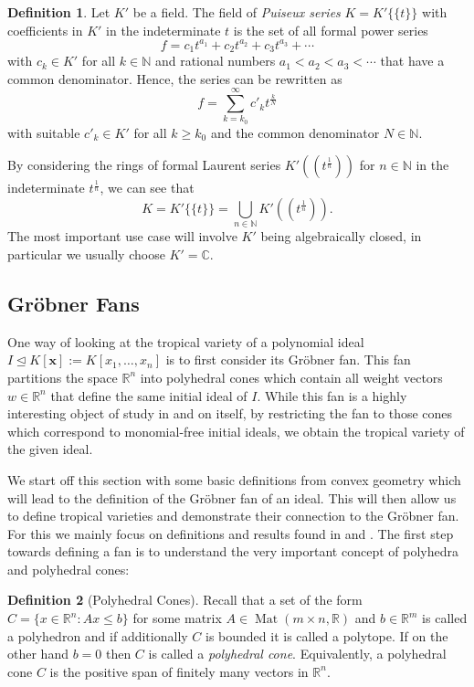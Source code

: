 \documentclass[
  paper=a4,
  titlepage,
  bibliography=totoc,
  listof=totoc,
  pagesize=pdftex
]{scrartcl}
\numberwithin{figure}{section}
\numberwithin{equation}{section}
\numberwithin{table}{section}
\newcommand*\setR{\mathds{R}}
\newcommand*\setC{\mathds{C}}
\newcommand*\setN{\mathds{N}}
\newcommand*\puiseux[2]{#1\{\!\{#2\}\!\}}
\let\vec\mathbf
\let\idealof\trianglelefteq
\DeclareMathOperator{\Mat}{Mat}
\theoremstyle{definition}
\newtheorem{definition}{Definition}
\numberwithin{definition}{section}
\begin{document}
\begin{definition}
  Let $K'$ be a field. The field of \emph{Puiseux series} $K = \puiseux{K'}{t}$ with
  coefficients in $K'$ in the indeterminate $t$ is the set of all formal power series
  \[
    f = c_1 t^{a_1} + c_2 t^{a_2} + c_3 t^{a_3} + \cdots
  \]
  with $c_k \in K'$ for all $k \in \setN$ and rational numbers $a_1 < a_2 < a_3 < \cdots$
  that have a common denominator. Hence, the series can be rewritten as
  \[
    f = \sum_{k = k_0}^\infty c'_k t^{\frac kN}
  \]
  with suitable $c'_k \in K'$ for all $k\geq k_0$ and the common denominator $N \in
  \setN$.
  \label{def:puiseux}
\end{definition}

By considering the rings of formal Laurent series $K'((t^{\frac1n}))$ for $n \in \setN$ in
the indeterminate $t^{\frac1n}$, we can see that
\[
  K = \puiseux{K'}t = \bigcup_{n \in \setN} K'((t^{\frac1n})).
\]
The most important use case will involve $K'$ being algebraically closed, in particular we
usually choose $K'=\setC$.

\subsection{Gröbner Fans}
\label{sec:grobFan}

One way of looking at the tropical variety of a polynomial ideal $I \idealof K[\vec x] :=
K[x_1, \dots, x_n]$ is to first consider its Gröbner fan. This fan partitions the space
$\setR^n$ into polyhedral cones which contain all weight vectors $w\in \setR^n$ that
define the same initial ideal of $I$. While this fan is a highly interesting object of
study in and on itself, by restricting the fan to those cones which correspond to
monomial-free initial ideals, we obtain the tropical variety of the given ideal.

We start off this section with some basic definitions from convex geometry which will lead
to the definition of the Gröbner fan of an ideal. This will then allow us to define
tropical varieties and demonstrate their connection to the Gröbner fan. For this we mainly
focus on definitions and results found in \cite{compGrobFan} and \cite{SturmGBCP}. The
first step towards defining a fan is to understand the very important concept of polyhedra
and polyhedral cones:

\begin{definition}[Polyhedral Cones]
  Recall that a set of the form $C = \{ x \in \setR^n : Ax \leq b \}$ for some matrix $A
  \in \Mat(m\times n, \setR)$ and $b \in \setR^m$ is called a polyhedron and if
  additionally $C$ is bounded it is called a polytope. If on the other hand $b=0$ then $C$
  is called a \emph{polyhedral cone}. Equivalently, a polyhedral cone $C$ is the positive
  span of finitely many vectors in $\setR^n$.
  \label{def:polyhedralCone}
\end{definition}
\end{document}
